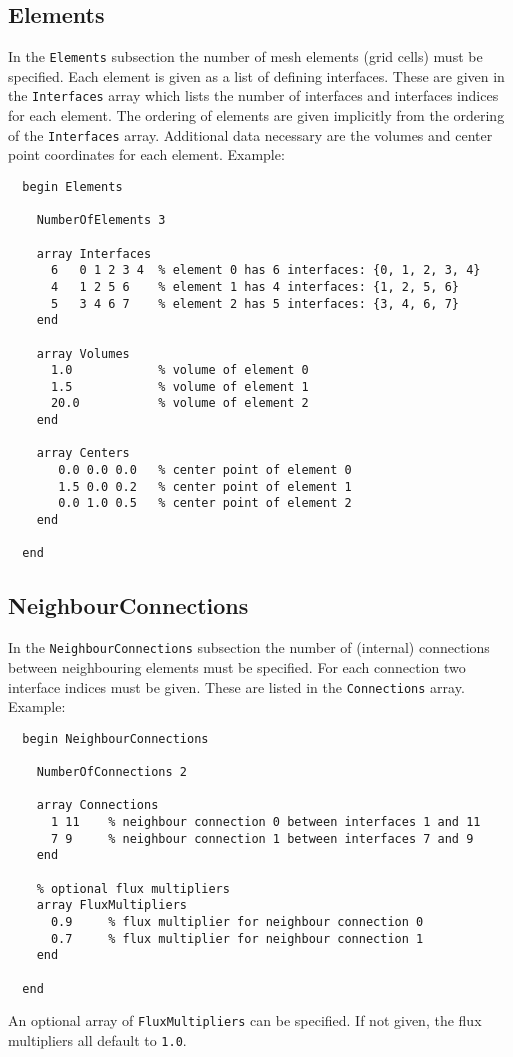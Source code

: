 \subsection{Elements}
\label{sec:elements-1}
In the \texttt{Elements} subsection the number of mesh elements (grid
cells) must be specified. Each element is given as a list of defining
interfaces. These are given in the \texttt{Interfaces} array which
lists the number of interfaces and interfaces indices for each
element. The ordering of elements are given implicitly from the
ordering of the \texttt{Interfaces} array. Additional data necessary
are the volumes and center point coordinates for each element.
Example:
%
\begin{verbatim}
  begin Elements

    NumberOfElements 3

    array Interfaces
      6   0 1 2 3 4  % element 0 has 6 interfaces: {0, 1, 2, 3, 4}
      4   1 2 5 6    % element 1 has 4 interfaces: {1, 2, 5, 6}
      5   3 4 6 7    % element 2 has 5 interfaces: {3, 4, 6, 7}
    end

    array Volumes
      1.0            % volume of element 0
      1.5            % volume of element 1
      20.0           % volume of element 2
    end

    array Centers
       0.0 0.0 0.0   % center point of element 0
       1.5 0.0 0.2   % center point of element 1
       0.0 1.0 0.5   % center point of element 2
    end

  end
\end{verbatim}


\subsection{NeighbourConnections}
\label{sec:neigh-connections}
In the \texttt{NeighbourConnections} subsection the number of
(internal) connections between neighbouring elements must be
specified. For each connection two interface indices must be given.
These are listed in the \texttt{Connections} array. Example:
%
\begin{verbatim}
  begin NeighbourConnections

    NumberOfConnections 2

    array Connections
      1 11    % neighbour connection 0 between interfaces 1 and 11
      7 9     % neighbour connection 1 between interfaces 7 and 9
    end

    % optional flux multipliers
    array FluxMultipliers
      0.9     % flux multiplier for neighbour connection 0
      0.7     % flux multiplier for neighbour connection 1
    end

  end
\end{verbatim}
%
An optional array of \texttt{FluxMultipliers} can be specified. If not
given, the flux multipliers all default to \texttt{1.0}.

